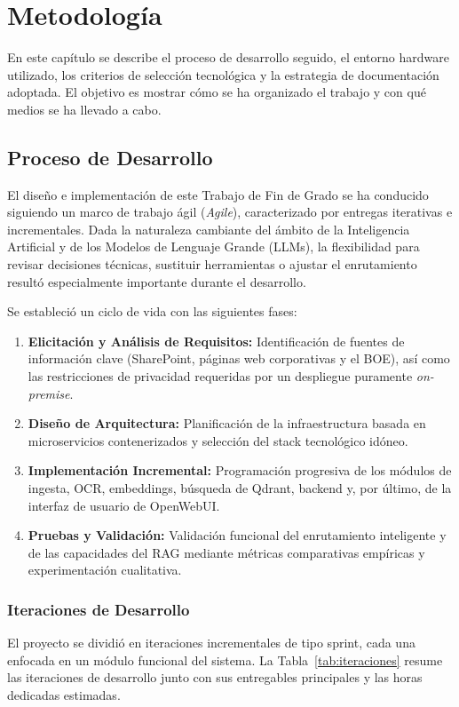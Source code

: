 \chapter{Metodología}
\label{cap:metodologia}

En este capítulo se describe el proceso de desarrollo seguido, el entorno hardware utilizado, los criterios de selección tecnológica y la estrategia de documentación adoptada. El objetivo es mostrar cómo se ha organizado el trabajo y con qué medios se ha llevado a cabo.

\section{Proceso de Desarrollo}

El diseño e implementación de este Trabajo de Fin de Grado se ha conducido siguiendo un marco de trabajo ágil (\textit{Agile}), caracterizado por entregas iterativas e incrementales. Dada la naturaleza cambiante del ámbito de la Inteligencia Artificial y de los Modelos de Lenguaje Grande (LLMs), la flexibilidad para revisar decisiones técnicas, sustituir herramientas o ajustar el enrutamiento resultó especialmente importante durante el desarrollo.

Se estableció un ciclo de vida con las siguientes fases:
\begin{enumerate}
    \item \textbf{Elicitación y Análisis de Requisitos:} Identificación de fuentes de información clave (SharePoint, páginas web corporativas y el BOE), así como las restricciones de privacidad requeridas por un despliegue puramente \textit{on-premise}.
    \item \textbf{Diseño de Arquitectura:} Planificación de la infraestructura basada en microservicios contenerizados y selección del stack tecnológico idóneo.
    \item \textbf{Implementación Incremental:} Programación progresiva de los módulos de ingesta, OCR, embeddings, búsqueda de Qdrant, backend y, por último, de la interfaz de usuario de OpenWebUI.
    \item \textbf{Pruebas y Validación:} Validación funcional del enrutamiento inteligente y de las capacidades del RAG mediante métricas comparativas empíricas y experimentación cualitativa.
\end{enumerate}

\subsection{Iteraciones de Desarrollo}
El proyecto se dividió en iteraciones incrementales de tipo sprint, cada una enfocada en un módulo funcional del sistema. La Tabla~\ref{tab:iteraciones} resume las iteraciones de desarrollo junto con sus entregables principales y las horas dedicadas estimadas.

